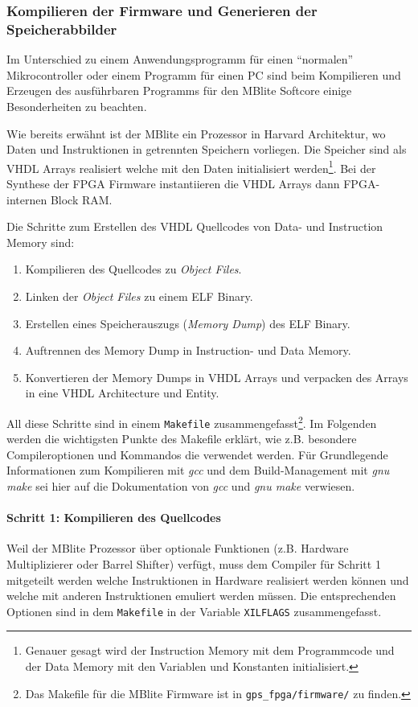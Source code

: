 \subsubsection{Kompilieren der Firmware und Generieren der Speicherabbilder}
Im Unterschied zu einem Anwendungsprogramm für einen \enquote{normalen} Mikrocontroller oder einem Programm für einen PC sind beim Kompilieren und Erzeugen des ausführbaren Programms für den MBlite Softcore einige Besonderheiten zu beachten.

Wie bereits erwähnt ist der MBlite ein Prozessor in Harvard Architektur, wo  Daten und Instruktionen in getrennten Speichern vorliegen. Die Speicher sind als VHDL Arrays realisiert welche mit den Daten initialisiert werden\footnote{Genauer gesagt wird der Instruction Memory mit dem Programmcode und der Data Memory mit den Variablen und Konstanten initialisiert.}. Bei der Synthese der FPGA Firmware instantiieren die VHDL Arrays dann FPGA-internen Block RAM.

Die Schritte zum Erstellen des VHDL Quellcodes von Data- und Instruction Memory sind:
\begin{enumerate}
    \item Kompilieren des Quellcodes zu \emph{Object Files}.
    \item Linken der \emph{Object Files} zu einem \gls{ELF} Binary.
    \item Erstellen eines Speicherauszugs (\emph{Memory Dump}) des \gls{ELF} Binary.
    \item Auftrennen des Memory Dump in Instruction- und Data Memory.
    \item Konvertieren der Memory Dumps in VHDL Arrays und verpacken des Arrays in eine VHDL Architecture und Entity.
\end{enumerate}

All diese Schritte sind in einem \lstinline$Makefile$ zusammengefasst\footnote{Das Makefile für die MBlite Firmware ist in \lstinline$gps_fpga/firmware/$ zu finden.}. Im Folgenden werden die wichtigsten Punkte des Makefile erklärt, wie z.B. besondere Compileroptionen und Kommandos die verwendet werden. Für Grundlegende Informationen zum Kompilieren mit \emph{gcc} und dem Build-Management mit \emph{gnu make} sei hier auf die Dokumentation von \emph{gcc} und \emph{gnu make} verwiesen.

\paragraph{Schritt 1: Kompilieren des Quellcodes}
Weil der MBlite Prozessor über optionale Funktionen  (z.B. Hardware Multiplizierer oder Barrel Shifter) verfügt, muss dem Compiler für Schritt 1 mitgeteilt werden welche Instruktionen in Hardware realisiert werden können und welche mit anderen Instruktionen emuliert werden müssen. Die entsprechenden Optionen sind in dem \lstinline$Makefile$ in der Variable \lstinline$XILFLAGS$ zusammengefasst.

